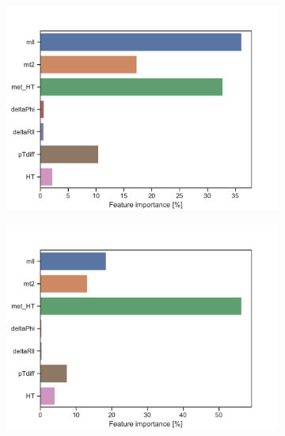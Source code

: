 \begin{figure}[H]
\begin{subfigure}[t!]{0.49\textwidth}
        \includegraphics[width = \textwidth]{Figures/WW/BDT/High_level/High/featureImportance.pdf}
        \caption{}
        \label{fig:featWWLow}
    \end{subfigure}
    \begin{subfigure}[t!]{0.49\textwidth}
        \includegraphics[width = \textwidth]{Figures/Mono_Z/ML/BDT/High_level/High/featureImportance.pdf}
        \caption{}
        \label{fig:featMonoZLow}
    \end{subfigure}
    \caption{}
    \label{fig:resExample}
\end{figure}


